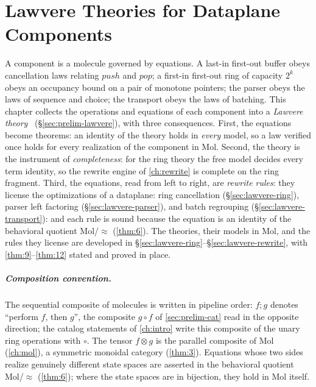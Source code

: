\chapter{Lawvere Theories for Dataplane Components}\label{ch:lawvere}

A component is a molecule governed by equations.
A last-in first-out buffer obeys cancellation laws relating
$\mathit{push}$ and $\mathit{pop}$; a first-in first-out ring of
capacity $2^{k}$ obeys an occupancy bound on a pair of monotone
pointers; the parser obeys the laws of sequence and choice; the
transport obeys the laws of batching. This chapter collects the operations
and equations of each component into a \emph{Lawvere theory}~\cite{lawvere,
arxiv-lawvere} (\S\ref{sec:prelim-lawvere}), with three consequences. First,
the equations become theorems: an identity of the theory holds in
\emph{every} model, so a law verified once holds for every realization of
the component in Mol. Second, the theory is the instrument of
\emph{completeness}: for the ring theory the free model decides every term
identity, so the rewrite engine of \autoref{ch:rewrite} is complete on the
ring fragment. Third, the equations, read from left to right, are
\emph{rewrite rules}: they license the optimizations of a dataplane:
ring cancellation (\S\ref{sec:lawvere-ring}), parser left factoring
(\S\ref{sec:lawvere-parser}), and batch regrouping
(\S\ref{sec:lawvere-transport}): and each rule is sound because the
equation is an identity of the behavioral quotient Mol/$\approx$
(\autoref{thm:6}). The theories, their models in Mol, and the rules they
license are developed in \S\ref{sec:lawvere-ring}--\S\ref{sec:lawvere-rewrite},
with \autoref{thm:9}--\autoref{thm:12} stated and proved in place.

\paragraph{Composition convention.}
The sequential composite of molecules is written in pipeline order: $f;g$
denotes ``perform $f$, then $g$'', the composite $g \circ f$ of
\autoref{sec:prelim-cat} read in the opposite direction; the catalog
statements of \autoref{ch:intro} write this composite of the unary ring
operations with $\circ$. The tensor $f \otimes g$ is the parallel composite
of Mol (\autoref{ch:mol}), a symmetric monoidal category (\autoref{thm:3}).
Equations whose two sides realize genuinely different state spaces are
asserted in the behavioral quotient Mol/$\approx$ (\autoref{thm:6}); where
the state spaces are in bijection, they hold in Mol itself.

